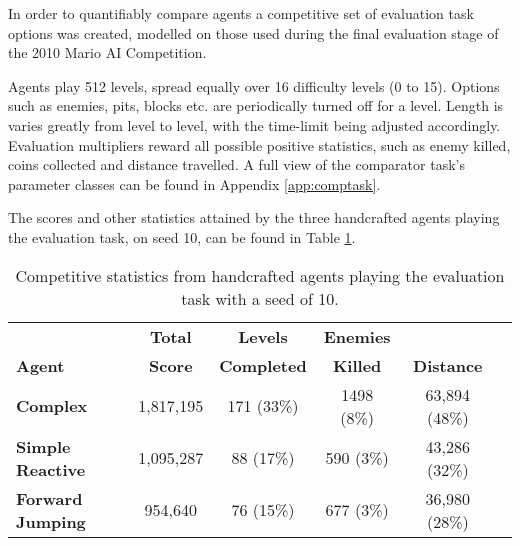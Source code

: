 In order to quantifiably compare agents a competitive set of evaluation task options was created, modelled on those used during the final evaluation stage of the 2010 Mario AI Competition.

Agents play 512 levels, spread equally over 16 difficulty levels (0 to 15). Options such as enemies, pits, blocks etc. are periodically turned off for a level. Length is varies greatly from level to level, with the time-limit being adjusted accordingly. Evaluation multipliers reward all possible positive statistics, such as enemy killed, coins collected and distance travelled. A full view of the comparator task's parameter classes can be found in Appendix \ref{app:comptask}.

The scores and other statistics attained by the three handcrafted agents playing the evaluation task, on seed 10, can be found in Table \ref{tab:hceval}.

\begin{table}
  \begin{adjustwidth}{-0cm}{-0cm}
  \begin{center} \small
    \begin{tabular}{ | l | c | c | c | c | c |}
    \hline
    & \textbf{Total} & \textbf{Levels} & \textbf{Enemies} & \Tstrut \\
    \textbf{Agent} & \textbf{Score} & \textbf{Completed} & \textbf{Killed} & \textbf{Distance} \Bstrut \\ \thickhline
    \textbf{Complex} & 1,817,195 & 171 (33\%) & 1498 (8\%) & 63,894 (48\%) \\ \hline
    \textbf{Simple Reactive} & 1,095,287 & 88 (17\%) & 590 (3\%) & 43,286 (32\%) \\ \hline
    \textbf{Forward Jumping} & 954,640 & 76 (15\%) & 677 (3\%) & 36,980 (28\%) \\ \hline

    \end{tabular}
  \end{center}
  \end{adjustwidth}
  \caption{\small Competitive statistics from handcrafted agents playing the evaluation task with a seed of 10.}
  \label{tab:hceval}
\end{table}